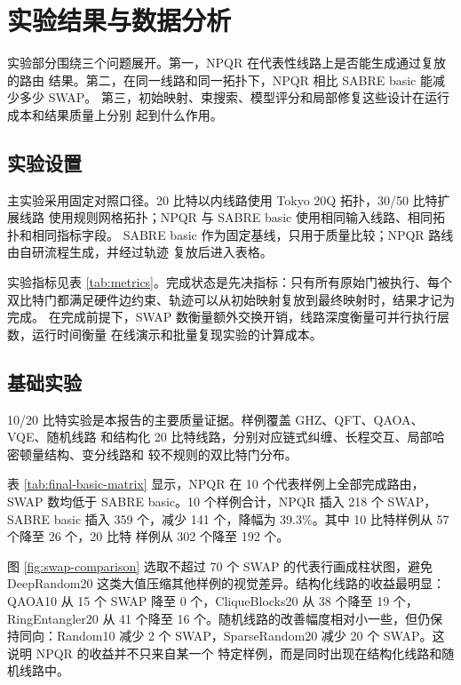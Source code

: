 \section{实验结果与数据分析}

实验部分围绕三个问题展开。第一，NPQR 在代表性线路上是否能生成通过复放的路由
结果。第二，在同一线路和同一拓扑下，NPQR 相比 SABRE basic 能减少多少 SWAP。
第三，初始映射、束搜索、模型评分和局部修复这些设计在运行成本和结果质量上分别
起到什么作用。

\subsection{实验设置}

主实验采用固定对照口径。20 比特以内线路使用 Tokyo 20Q 拓扑，30/50 比特扩展线路
使用规则网格拓扑；NPQR 与 SABRE basic 使用相同输入线路、相同拓扑和相同指标字段。
SABRE basic 作为固定基线，只用于质量比较；NPQR 路线由自研流程生成，并经过轨迹
复放后进入表格。



实验指标见表 \ref{tab:metrics}。完成状态是先决指标：只有所有原始门被执行、每个
双比特门都满足硬件边约束、轨迹可以从初始映射复放到最终映射时，结果才记为完成。
在完成前提下，SWAP 数衡量额外交换开销，线路深度衡量可并行执行层数，运行时间衡量
在线演示和批量复现实验的计算成本。

\subsection{基础实验}

10/20 比特实验是本报告的主要质量证据。样例覆盖 GHZ、QFT、QAOA、VQE、随机线路
和结构化 20 比特线路，分别对应链式纠缠、长程交互、局部哈密顿量结构、变分线路和
较不规则的双比特门分布。



表 \ref{tab:final-basic-matrix} 显示，NPQR 在 10 个代表样例上全部完成路由，SWAP
数均低于 SABRE basic。10 个样例合计，NPQR 插入 218 个 SWAP，SABRE basic 插入
359 个，减少 141 个，降幅为 39.3\%。其中 10 比特样例从 57 个降至 26 个，20 比特
样例从 302 个降至 192 个。

图 \ref{fig:swap-comparison} 选取不超过 70 个 SWAP 的代表行画成柱状图，避免
DeepRandom20 这类大值压缩其他样例的视觉差异。结构化线路的收益最明显：QAOA10
从 15 个 SWAP 降至 0 个，CliqueBlocks20 从 38 个降至 19 个，RingEntangler20 从
41 个降至 16 个。随机线路的改善幅度相对小一些，但仍保持同向：Random10 减少
2 个 SWAP，SparseRandom20 减少 20 个 SWAP。这说明 NPQR 的收益并不只来自某一个
特定样例，而是同时出现在结构化线路和随机线路中。

